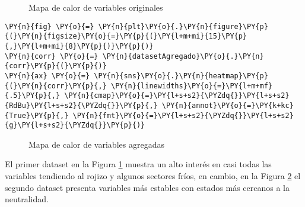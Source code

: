     \begin{center}
    \begin{figure}[H]
    \centering
    \caption{Mapa de calor de variables originales}
    \label{fig:mcvo}
		\end{figure}
    \end{center}

    
    \begin{tcolorbox}[breakable, size=fbox, boxrule=1pt, pad at break*=1mm,colback=cellbackground, colframe=cellborder]
\begin{Verbatim}[commandchars=\\\{\}]
\PY{n}{fig} \PY{o}{=} \PY{n}{plt}\PY{o}{.}\PY{n}{figure}\PY{p}{(}\PY{n}{figsize}\PY{o}{=}\PY{p}{(}\PY{l+m+mi}{15}\PY{p}{,}\PY{l+m+mi}{8}\PY{p}{)}\PY{p}{)}
\PY{n}{corr} \PY{o}{=} \PY{n}{datasetAgregado}\PY{o}{.}\PY{n}{corr}\PY{p}{(}\PY{p}{)}
\PY{n}{ax} \PY{o}{=} \PY{n}{sns}\PY{o}{.}\PY{n}{heatmap}\PY{p}{(}\PY{n}{corr}\PY{p}{,} \PY{n}{linewidths}\PY{o}{=}\PY{l+m+mf}{.5}\PY{p}{,} \PY{n}{cmap}\PY{o}{=}\PY{l+s+s2}{\PYZdq{}}\PY{l+s+s2}{RdBu}\PY{l+s+s2}{\PYZdq{}}\PY{p}{,} \PY{n}{annot}\PY{o}{=}\PY{k+kc}{True}\PY{p}{,} \PY{n}{fmt}\PY{o}{=}\PY{l+s+s2}{\PYZdq{}}\PY{l+s+s2}{g}\PY{l+s+s2}{\PYZdq{}}\PY{p}{)}
\end{Verbatim}
\end{tcolorbox}

    \begin{center}
    	\begin{figure}[H]
    	 \centering
    	\caption{Mapa de calor de variables agregadas}
	\label{fig:mcva}
	\end{figure}
\end{center}
    
    El primer dataset en la Figura \ref{fig:mcvo} muestra un alto interés en casi todas las variables tendiendo al rojizo y algunos sectores fríos, en cambio, en la Figura \ref{fig:mcva} el segundo dataset presenta variables más estables con estados más cercanos a la neutralidad.